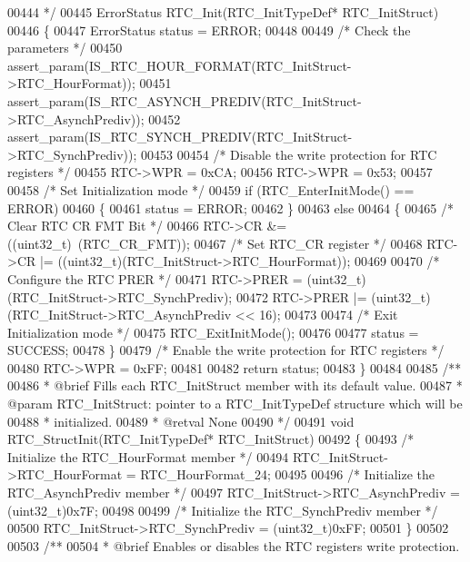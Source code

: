\begin{DoxyCode}
00444 \textcolor{comment}{  */}
00445 ErrorStatus RTC_Init(RTC\_InitTypeDef* RTC\_InitStruct)
00446 \{
00447   ErrorStatus status = ERROR;
00448 
00449   \textcolor{comment}{/* Check the parameters */}
00450   assert_param(IS\_RTC\_HOUR\_FORMAT(RTC\_InitStruct->RTC\_HourFormat));
00451   assert_param(IS\_RTC\_ASYNCH\_PREDIV(RTC\_InitStruct->RTC\_AsynchPrediv));
00452   assert_param(IS\_RTC\_SYNCH\_PREDIV(RTC\_InitStruct->RTC\_SynchPrediv));
00453 
00454   \textcolor{comment}{/* Disable the write protection for RTC registers */}
00455   RTC->WPR = 0xCA;
00456   RTC->WPR = 0x53;
00457 
00458   \textcolor{comment}{/* Set Initialization mode */}
00459   \textcolor{keywordflow}{if} (RTC_EnterInitMode() == ERROR)
00460   \{
00461     status = ERROR;
00462   \}
00463   \textcolor{keywordflow}{else}
00464   \{
00465     \textcolor{comment}{/* Clear RTC CR FMT Bit */}
00466     RTC->CR &= ((uint32\_t)~(RTC_CR_FMT));
00467     \textcolor{comment}{/* Set RTC\_CR register */}
00468     RTC->CR |=  ((uint32\_t)(RTC\_InitStruct->RTC\_HourFormat));
00469 
00470     \textcolor{comment}{/* Configure the RTC PRER */}
00471     RTC->PRER = (uint32\_t)(RTC\_InitStruct->RTC\_SynchPrediv);
00472     RTC->PRER |= (uint32\_t)(RTC\_InitStruct->RTC\_AsynchPrediv << 16);
00473 
00474     \textcolor{comment}{/* Exit Initialization mode */}
00475     RTC_ExitInitMode();
00476 
00477     status = SUCCESS;
00478   \}
00479   \textcolor{comment}{/* Enable the write protection for RTC registers */}
00480   RTC->WPR = 0xFF;
00481 
00482   \textcolor{keywordflow}{return} status;
00483 \}
00484 
00485 \textcolor{comment}{/**}
00486 \textcolor{comment}{  * @brief  Fills each RTC\_InitStruct member with its default value.}
00487 \textcolor{comment}{  * @param  RTC\_InitStruct: pointer to a RTC\_InitTypeDef structure which will be }
00488 \textcolor{comment}{  *         initialized.}
00489 \textcolor{comment}{  * @retval None}
00490 \textcolor{comment}{  */}
00491 \textcolor{keywordtype}{void} RTC_StructInit(RTC\_InitTypeDef* RTC\_InitStruct)
00492 \{
00493   \textcolor{comment}{/* Initialize the RTC\_HourFormat member */}
00494   RTC\_InitStruct->RTC_HourFormat = RTC_HourFormat_24;
00495 
00496   \textcolor{comment}{/* Initialize the RTC\_AsynchPrediv member */}
00497   RTC\_InitStruct->RTC_AsynchPrediv = (uint32\_t)0x7F;
00498 
00499   \textcolor{comment}{/* Initialize the RTC\_SynchPrediv member */}
00500   RTC\_InitStruct->RTC_SynchPrediv = (uint32\_t)0xFF;
00501 \}
00502 
00503 \textcolor{comment}{/**}
00504 \textcolor{comment}{  * @brief  Enables or disables the RTC registers write protection.}

\end{DoxyCode}
